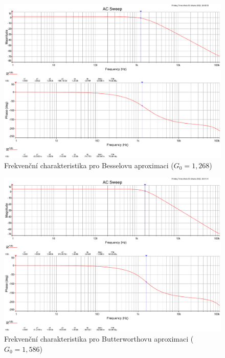\documentclass[twoside]{article}
\begin{document}
\begin{figure}[h!]
    \centering
    \includegraphics[width=0.92\linewidth]{bode_bessel.pdf}
    \caption{Frekvenční charakteristika pro Besselovu aproximaci ($G_0 = 1,268$)}
    \label{fig:bode_bessel}
\end{figure}

\begin{figure}[h!]
    \centering
    \includegraphics[width=0.92\linewidth]{bode_butter.pdf}
    \caption{Frekvenční charakteristika pro Butterworthovu aproximaci ($G_0 = 1,586$)}
    \label{fig:bode_butter}
\end{figure}
\end{document}
